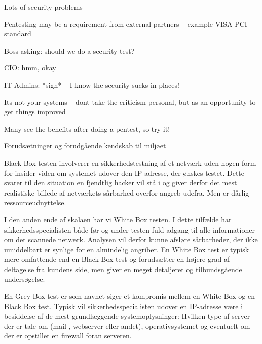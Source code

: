 \documentclass[Screen16to9,17pt]{foils}
\begin{document}
\begin{list1}
\item Lots of security problems
\item Pentesting may be a requirement from external partners -- example VISA PCI standard
\end{list1}

\begin{list2}
\item Boss asking: should we do a security test?
\item CIO: hmm, okay
\item IT Admins: *sigh* -- I know the security sucks in places!
\item Its not your systems -- dont take the criticism personal, but as an opportunity to get things improved
\end{list2}

\vskip 2cm
\centerline{\Large Many see the benefits after doing a pentest, so try it!}


\begin{list2}
\item Forudsætninger og forudgående kendskab til miljøet
\item Black Box testen involverer en sikkerhedstestning af et netværk uden
nogen form for insider viden om systemet udover den IP-adresse, der
ønskes testet. Dette svarer til den situation en fjendtlig hacker vil
stå i og giver derfor det mest realistiske billede af netværkets
sårbarhed overfor angreb udefra. Men er dårlig ressourceudnyttelse.
\item I den anden ende  af skalaen har vi White Box testen. I dette tilfælde
har sikkerhedsspecialisten både før og under testen fuld adgang til
alle informationer om det scannede netværk. Analysen vil derfor kunne
afsløre sårbarheder, der ikke umiddelbart er synlige for en almindelig
angriber. En White Box test er typisk mere omfattende end en Black Box
test og forudsætter en højere grad af deltagelse fra kundens side, men
giver en meget detaljeret og tilbundsgående undersøgelse.

\item En Grey Box test er som navnet siger et kompromis mellem en White Box
og en Black Box test. Typisk vil sikkerhedsspecialisten udover en
IP-adresse være i besiddelse af de mest grundlæggende
systemoplysninger: Hvilken type af server der er tale om (mail-,
webserver eller andet), operativsystemet og eventuelt om der er
opstillet en firewall foran serveren.
\end{list2}
\end{document}
